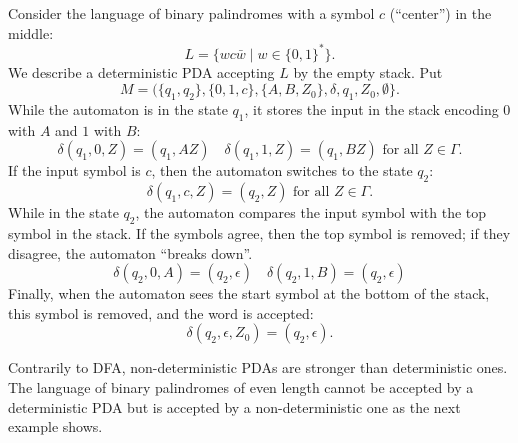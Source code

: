 \begin{page}
\setcounter{section}{6}
\setcounter{subsection}{1}
\setcounter{dfn}{4}
\label{portion:1120}

\begin{exl}
Consider the language of binary palindromes with a symbol $c$ (``center'') in the middle:
\[
L = \{w c \bar{w} \mid w \in \{0,1\}^*\}.
\]
We describe a deterministic PDA accepting $L$ by the empty stack. Put
\[
M = (\{q_1, q_2\}, \{0, 1, c\}, \{A, B, Z_0\}, \delta, q_1, Z_0, \emptyset\}.
\]
While the automaton is in the state $q_1$, it stores the input in the stack encoding $0$ with $A$ and $1$ with $B$:
\[
\delta(q_1, 0, Z) = (q_1, AZ) \quad \delta(q_1, 1, Z) = (q_1, BZ) \text{ for all }Z \in \Gamma.
\]
If the input symbol is $c$, then the automaton switches to the state $q_2$:
\[
\delta(q_1, c, Z) = (q_2, Z) \text{ for all }Z \in \Gamma.
\]
While in the state $q_2$, the automaton compares the input symbol with the top symbol in the stack.
If the symbols agree, then the top symbol is removed; if they disagree, the automaton ``breaks down''.
\[
\delta(q_2, 0, A) = (q_2, \epsilon) \quad \delta(q_2, 1, B) = (q_2, \epsilon)
\]
Finally, when the automaton sees the start symbol at the bottom of the stack, this symbol is removed, and the word is accepted:
\[
\delta(q_2, \epsilon, Z_0) = (q_2, \epsilon).
\]
\end{exl}

\end{page}

\begin{page}
\setcounter{section}{6}
\setcounter{subsection}{1}
\setcounter{dfn}{4}
\label{portion:1121}


Contrarily to DFA, non-deterministic PDAs are stronger than deterministic ones.
The language of binary palindromes of even length cannot be accepted by a deterministic PDA
but is accepted by a non-deterministic one as the next example shows.


\end{page}

